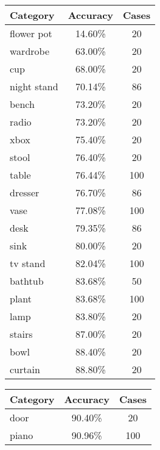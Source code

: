 \begin{table}[]
	\centering
	\begin{tabular}[t]{lcc}
		\hline
		\textbf{Category} & \textbf{Accuracy} & \textbf{Cases} \\ \hline
		flower pot        & 14.60\%           & 20             \\
		wardrobe          & 63.00\%           & 20             \\
		cup               & 68.00\%           & 20             \\
		night stand       & 70.14\%           & 86             \\
		bench             & 73.20\%           & 20             \\
		radio             & 73.20\%           & 20             \\
		xbox              & 75.40\%           & 20             \\
		stool             & 76.40\%           & 20             \\
		table             & 76.44\%           & 100            \\
		dresser           & 76.70\%           & 86             \\
		vase              & 77.08\%           & 100            \\
		desk              & 79.35\%           & 86             \\
		sink              & 80.00\%           & 20             \\
		tv stand          & 82.04\%           & 100            \\
		bathtub           & 83.68\%           & 50             \\
		plant             & 83.68\%           & 100            \\
		lamp              & 83.80\%           & 20             \\
		stairs            & 87.00\%           & 20             \\
		bowl              & 88.40\%           & 20             \\
		curtain           & 88.80\%           & 20 \\ \hline
	\end{tabular}
	\begin{tabular}[t]{lcc}
		\hline
		\textbf{Category} & \textbf{Accuracy} & \textbf{Cases} \\ \hline
		door              & 90.40\%           & 20             \\
		piano             & 90.96\%           & 100            \\

\end{tabular}
\end{table}
